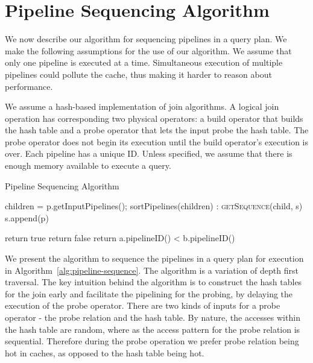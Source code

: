 \section{Pipeline Sequencing Algorithm}\label{sec:pipe-seq-algo}
We now describe our algorithm for sequencing pipelines in a query plan. 
We make the following assumptions for the use of our algorithm. 
We assume that only one pipeline is executed at a time.
Simultaneous execution of multiple pipelines could pollute the cache, thus making it harder to reason about performance.

We assume a hash-based implementation of join algorithms.
A logical join operation has corresponding two physical operators: a build operator that builds the hash table and a probe operator that lets the input probe the hash table.
The probe operator does not begin its execution until the build operator's execution is over.
Each pipeline has a unique ID. 
Unless specified, we assume that there is enough memory available to execute a query. 

\begin{algorithm}
	\caption{Pipeline Sequencing Algorithm}
	\begin{algorithmic}[1]
		\State children = p.getInputPipelines();
		\State sortPipelines(children) 		\label{alg:sort}
		:
			\State \textsc{getSequence}(child, s)
		\EndFor
		\State s.append(p)		
		\EndFunction		
		\State 
		\State {}
		\label{alg:comparator}

			\State return true
			\State return false
		\Else
			\State return a.pipelineID() < b.pipelineID()\label{alg:break-ties}
		\EndIf
		\EndFunction		
	\end{algorithmic}
	\label{alg:pipeline-sequence}
\end{algorithm}

We present the algorithm to sequence the pipelines in a query plan for execution in  Algorithm~\ref{alg:pipeline-sequence}.
The algorithm is a variation of depth first traversal. 
The key intuition behind the algorithm is to construct the hash tables for the join early and facilitate the pipelining for the probing, by delaying the execution of the probe operator.
There are two kinds of inputs for a probe operator - the probe relation and the hash table.
By nature, the accesses within the hash table are random, where as the access pattern for the probe relation is sequential. 
Therefore during the probe operation we prefer probe relation being hot in caches, as opposed to the hash table being hot.

